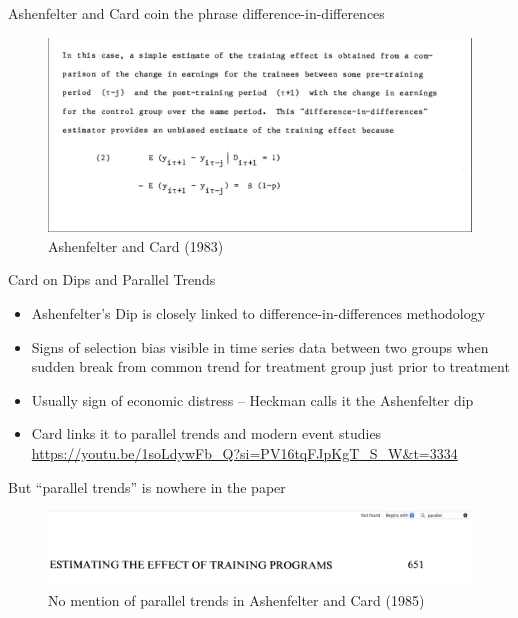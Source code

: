 \documentclass{beamer}
\begin{document}
\begin{frame}{Ashenfelter and Card coin the phrase difference-in-differences}

	\begin{figure}
	\caption{Ashenfelter and Card (1983)}
	\includegraphics[scale=0.2]{./lecture_includes/orley1983.png}
	\end{figure}


\end{frame}




\begin{frame}{Card on Dips and Parallel Trends}

\begin{itemize}

\item Ashenfelter's Dip is closely linked to difference-in-differences methodology
\item Signs of selection bias visible in time series data between two groups when sudden break from common trend for treatment group just prior to treatment
\item Usually sign of economic distress -- Heckman calls it the Ashenfelter dip
\item Card links it to parallel trends and modern event studies \\ \url{https://youtu.be/1soLdywFb_Q?si=PV16tqFJpKgT_S_W&t=3334}
\end{itemize}

\end{frame}


\begin{frame}{But ``parallel trends'' is nowhere in the paper}

	\begin{figure}
	\caption{No mention of parallel trends in Ashenfelter and Card (1985)}
	\includegraphics[scale=0.2]{./lecture_includes/nomention.png}
	\end{figure}

\end{frame}
\end{document}
